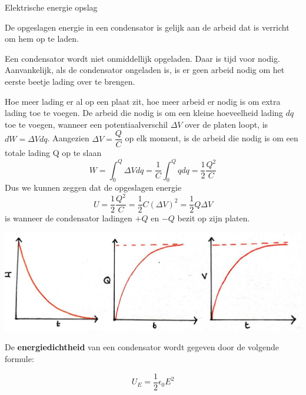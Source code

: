 \begin{theo}{Elektrische energie opslag}

    De opgeslagen energie in een condensator is gelijk aan de arbeid dat is verricht om hem op te laden.
    
    
    Een condensator wordt niet onmiddellijk opgeladen. Daar is tijd voor nodig. Aanvankelijk, als de condensator ongeladen is, is er geen arbeid nodig om het eerste beetje lading over te brengen. 
    
    
    Hoe meer lading er al op een plaat zit, hoe meer arbeid er nodig is om extra lading toe te voegen. De arbeid die nodig is om een kleine hoeveelheid lading $dq$ toe te voegen, wanneer een potentiaalverschil $\Delta V$ over de platen loopt, is $dW = \Delta V dq$. Aangezien $\Delta V = \dfrac{Q}{C}$ op elk moment, is de arbeid die nodig is om een totale lading Q op te slaan
    \begin{equation*}
        W = \int_0^Q \Delta V dq = \dfrac{1}{C} \int_0^Q qdq = \dfrac{1}{2}\dfrac{Q^2}{C}
    \end{equation*}
    Dus we kunnen zeggen dat de opgeslagen energie 
    \begin{equation*}
        U = \dfrac{1}{2}\dfrac{Q^2}{C} = \dfrac{1}{2}C(\Delta V)^2 = \dfrac{1}{2}Q\Delta V
    \end{equation*}
    is wanneer de condensator ladingen $+Q$ en $-Q$ bezit op zijn platen.
    \begin{center}
        \includegraphics[scale = 0.25]{Images/Elektriciteit/OpladenGrafieken.jpg}
    \end{center} 
    \noindent De \textbf{energiedichtheid} van een condensator wordt gegeven door de volgende formule:

    \begin{equation*}
        U_E = \dfrac{1}{2}\epsilon_0E^2
    \end{equation*}
\end{theo}

